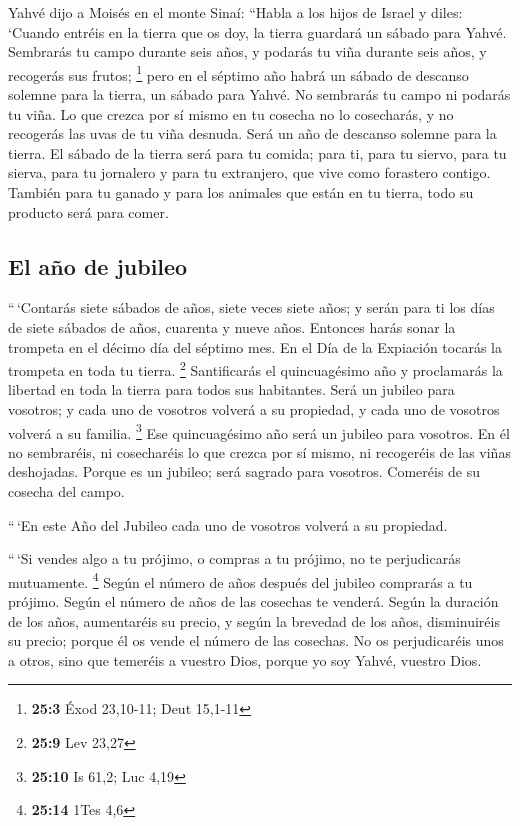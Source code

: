 \begin{paracol}{2}
 Yahvé dijo a Moisés en el monte Sinaí: 
``Habla a los hijos de Israel y diles: `Cuando entréis en la tierra que
os doy, la tierra guardará un sábado para Yahvé. 
Sembrarás tu campo durante seis años, y podarás tu viña durante seis
años, y recogerás sus frutos; \footnote{\textbf{25:3} Éxod 23,10-11;
  Deut 15,1-11}  pero en el séptimo año habrá un sábado de
descanso solemne para la tierra, un sábado para Yahvé. No sembrarás tu
campo ni podarás tu viña.  Lo que crezca por sí mismo en
tu cosecha no lo cosecharás, y no recogerás las uvas de tu viña desnuda.
Será un año de descanso solemne para la tierra.  El sábado
de la tierra será para tu comida; para ti, para tu siervo, para tu
sierva, para tu jornalero y para tu extranjero, que vive como forastero
contigo.  También para tu ganado y para los animales que
están en tu tierra, todo su producto será para comer.

\hypertarget{el-auxf1o-de-jubileo}{%
\subsection{El año de jubileo}\label{el-auxf1o-de-jubileo}}

 ``\,`Contarás siete sábados de años, siete veces siete
años; y serán para ti los días de siete sábados de años, cuarenta y
nueve años.  Entonces harás sonar la trompeta en el décimo
día del séptimo mes. En el Día de la Expiación tocarás la trompeta en
toda tu tierra. \footnote{\textbf{25:9} Lev 23,27} 
Santificarás el quincuagésimo año y proclamarás la libertad en toda la
tierra para todos sus habitantes. Será un jubileo para vosotros; y cada
uno de vosotros volverá a su propiedad, y cada uno de vosotros volverá a
su familia. \footnote{\textbf{25:10} Is 61,2; Luc 4,19} 
Ese quincuagésimo año será un jubileo para vosotros. En él no
sembraréis, ni cosecharéis lo que crezca por sí mismo, ni recogeréis de
las viñas deshojadas.  Porque es un jubileo; será sagrado
para vosotros. Comeréis de su cosecha del campo.

 ``\,`En este Año del Jubileo cada uno de vosotros
volverá a su propiedad.

 ``\,`Si vendes algo a tu prójimo, o compras a tu
prójimo, no te perjudicarás mutuamente. \footnote{\textbf{25:14} 1Tes
  4,6}  Según el número de años después del jubileo
comprarás a tu prójimo. Según el número de años de las cosechas te
venderá.  Según la duración de los años, aumentaréis su
precio, y según la brevedad de los años, disminuiréis su precio; porque
él os vende el número de las cosechas.  No os
perjudicaréis unos a otros, sino que temeréis a vuestro Dios, porque yo
soy Yahvé, vuestro Dios.


\end{paracol}
